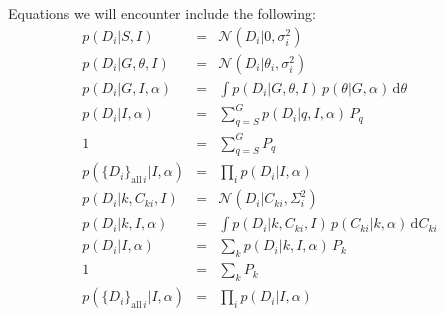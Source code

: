 \documentclass[12pt, letterpaper]{article}
\newcommand{\data}{D}
\newcommand{\alldata}{\{D_i\}_{{\mathrm{all}}\,i}}
\newcommand{\galpars}{\theta}
\newcommand{\hyperpars}{\alpha}
\newcommand{\amplitude}{C}
\newcommand{\dd}{\mathrm{d}}
\newcommand{\normal}{\mathscr{N}}
\begin{document}
Equations we will encounter include the following:
\begin{eqnarray}\displaystyle
p(\data_i|S,I) &=& \normal(\data_i|0,\sigma_i^2) \\
p(\data_i|G,\galpars,I) &=& \normal(\data_i|\galpars_i,\sigma_i^2) \\
p(\data_i|G,I,\hyperpars) &=& \int p(\data_i|G,\galpars,I)\,p(\galpars|G,\hyperpars)\,\dd \galpars \\
p(\data_i|I,\hyperpars) &=& \sum_{q=S}^G p(\data_i|q,I,\hyperpars)\,P_q \\
1 &=& \sum_{q=S}^G P_q \\
p(\alldata|I,\hyperpars) &=& \prod_i p(\data_i|I,\hyperpars) \\
p(\data_i|k,\amplitude_{ki},I) &=& \normal(\data_i|\amplitude_{ki},\Sigma_i^2) \\
p(\data_i|k,I,\hyperpars) &=& \int p(\data_i|k,\amplitude_{ki},I)\,p(\amplitude_{ki}|k,\hyperpars)\,\dd \amplitude_{ki} \\
p(\data_i|I,\hyperpars) &=& \sum_k p(\data_i|k,I,\hyperpars)\,P_k \\
1 &=& \sum_k P_k \\
p(\alldata|I,\hyperpars) &=& \prod_i p(\data_i|I,\hyperpars) \\
\end{eqnarray}
\end{document}
